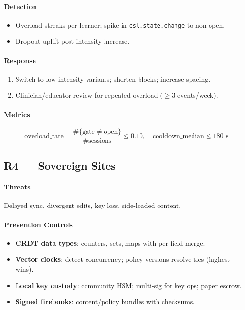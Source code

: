 \documentclass[11pt]{article}
\theoremstyle{plain}
\begin{document}
\paragraph{Detection}
\begin{itemize}
  \item Overload streaks per learner; spike in \texttt{csl.state.change} to non-open.
  \item Dropout uplift post-intensity increase.
\end{itemize}

\paragraph{Response}
\begin{enumerate}
  \item Switch to low-intensity variants; shorten blocks; increase spacing.
  \item Clinician/educator review for repeated overload $(\ge 3$ events/week$)$.
\end{enumerate}

\paragraph{Metrics}
\[
\text{overload\_rate}=\frac{\#\{\text{gate}\neq\text{open}\}}{\#\text{sessions}} \le 0.10,\quad
\text{cooldown\_median}\le 180\text{ s}
\]

\subsection{R4 — Sovereign Sites}
\paragraph{Threats}
Delayed sync, divergent edits, key loss, side-loaded content.

\paragraph{Prevention Controls}
\begin{itemize}
  \item \textbf{CRDT data types}: counters, sets, maps with per-field merge.
  \item \textbf{Vector clocks}: detect concurrency; policy versions resolve ties (highest wins).
  \item \textbf{Local key custody}: community HSM; multi-sig for key ops; paper escrow.
  \item \textbf{Signed firebooks}: content/policy bundles with checksums.
\end{itemize}
\end{document}
